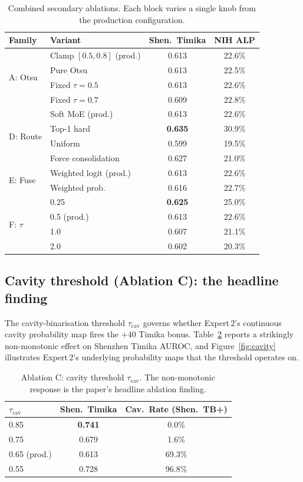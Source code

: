 \documentclass{article}
\begin{document}
\begin{table}[!htbp]
\caption{Combined secondary ablations. Each block varies a single knob from the production configuration.}
\label{tab:abl_combined}
\centering
\footnotesize
\setlength{\tabcolsep}{4pt}
\begin{tabular}{llcc}
\toprule
Family & Variant & Shen.\ Timika & NIH ALP \\
\midrule
\multirow{4}{*}{A: Otsu} & Clamp $[0.5,0.8]$ (prod.) & 0.613 & 22.6\% \\
 & Pure Otsu & 0.613 & 22.5\% \\
 & Fixed $\tau{=}0.5$ & 0.613 & 22.6\% \\
 & Fixed $\tau{=}0.7$ & 0.609 & 22.8\% \\
\midrule
\multirow{4}{*}{D: Route} & Soft MoE (prod.) & 0.613 & 22.6\% \\
 & Top-1 hard & \textbf{0.635} & 30.9\% \\
 & Uniform & 0.599 & 19.5\% \\
 & Force consolidation & 0.627 & 21.0\% \\
\midrule
\multirow{2}{*}{E: Fuse} & Weighted logit (prod.) & 0.613 & 22.6\% \\
 & Weighted prob.\ & 0.616 & 22.7\% \\
\midrule
\multirow{4}{*}{F: $\tau$} & 0.25 & \textbf{0.625} & 25.0\% \\
 & 0.5 (prod.) & 0.613 & 22.6\% \\
 & 1.0 & 0.607 & 21.1\% \\
 & 2.0 & 0.602 & 20.3\% \\
\bottomrule
\end{tabular}
\end{table}

\subsection{Cavity threshold (Ablation C): the headline finding}
\label{sec:abl_C}

The cavity-binarisation threshold $\tau_{\text{cav}}$ governs whether Expert\,2's continuous cavity probability map fires the $+40$ Timika bonus. Table~\ref{tab:abl_cav} reports a strikingly non-monotonic effect on Shenzhen Timika AUROC, and Figure~\ref{fig:cavity} illustrates Expert\,2's underlying probability maps that the threshold operates on.

\begin{table}[!htbp]
\caption{Ablation C: cavity threshold $\tau_{\text{cav}}$. The non-monotonic response is the paper's headline ablation finding.}
\label{tab:abl_cav}
\centering
\small
\begin{tabular}{lcc}
\toprule
$\tau_{\text{cav}}$ & Shen.\ Timika & Cav.\ Rate (Shen.\ TB+) \\
\midrule
0.85 & \textbf{0.741} & 0.0\% \\
0.75 & 0.679 & 1.6\% \\
0.65 (prod.) & 0.613 & 69.3\% \\
0.55 & 0.728 & 96.8\% \\
\bottomrule
\end{tabular}
\end{table}
\end{document}

